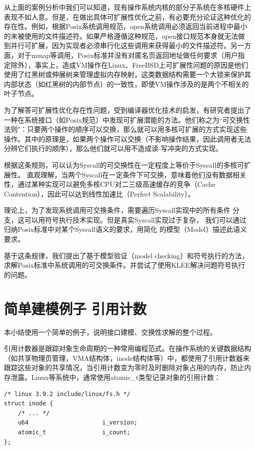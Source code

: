 从上面的案例分析中我们可以知道，现有操作系统内核的部分子系统在多核硬件上表现不如人意。但是，在做出具体可扩展性优化之前，有必要充分论证这种优化的存在性。例如，根据Posix系统调用规范，open系统调用必须返回当前进程中最小的未被使用的文件描述符。如果严格遵循这种规范，open接口规范本身就无法做到并行可扩展，因为实现者必须串行化这些调用来获得最小的文件描述符。另一方面，对于mmap等调用，Posix标准并没有对匿名页返回地址做任何要求（用户指定除外），事实上，造成VM操作在Linux、FreeBSD上可扩展性问题的原因是他们使用了红黑树或伸展树来管理虚拟内存映射\cite{radixvm:eurosys13}，这类数据结构需要一个大锁来保护其内部状态（如红黑树的内部节点）的一致性，即使VM操作涉及的是两个不相关的叶子节点。

为了解答可扩展性优化存在性问题，受到编译器优化技术的启发，有研究者提出了一种在系统接口（如Posix规范）中发现可扩展潜能的方法\cite{commuter:2013}。他们称之为``可交换性法则"：只要两个操作的顺序可以交换，那么就可以用多核可扩展的方式实现这些操作。其中的原理是，如果两个操作可以交换（不影响操作结果，因此调用者无法分辨它们执行的顺序），那么他们就可以用不造成读-写冲突的方式实现。

根据这条规则，可以认为Syscall的可交换性在一定程度上等价于Syscall的多核可扩展性。
直观理解，当两个Syscall在一定条件下可交换，意味着他们没有数据相关性，通过某种实现可以避免多核CPU对二三级高速缓存的竞争（Cache
Contention），因此可以达到线性加速比（Perfect Scalability）。

理论上，为了发现系统调用可交换条件，需要遍历Syscall实现中的所有条件
分支，这可以用符号执行技术实现。但是真实Syscall实现过于复杂，
我们可以通过归纳Posix标准中对某个Syscall语义的要求，用简化
的模型（Model）描述此语义要求。

基于这条规律，我们提出了基于模型验证（model
checking）和符号执行的方法，求解Posix标准中系统调用的可交换条件。并尝试了使用KLEE\cite{Cadar:2008:KUA:1855741.1855756}解决问题符号执行的问题。

\section{简单建模例子 \pozhehao 引用计数}
\label{sec:counter}
本小结使用一个简单的例子，说明接口建模、交换性求解的整个过程。

引用计数器是跟踪对象生命周期的一种常用编程范式。在操作系统的关键数据结构（如共享物理页管理，VMA结构体，inode结构体等）中，都使用了引用计数器来跟踪这些对象的共享情况，当引用计数变为零时及时删除对象占用的内存，防止内存泄露。Linux等系统中，通常使用atomic\_t类型记录对象的引用计数：

\begin{lstlisting}
/* linux 3.9.2 include/linux/fs.h */
struct inode {
	/* ... */
	u64                     i_version;
	atomic_t                i_count;
};
\end{lstlisting}

